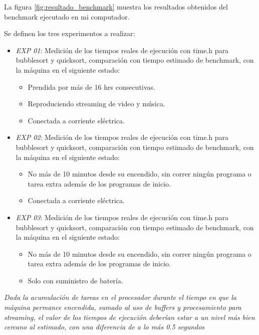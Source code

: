 \documentclass{memoria}
\begin{document}
La figura \ref{fig:resultado_benchmark} muestra los resultados obtenidos del benchmark ejecutado en mi computador.


Se definen los tres experimentos a realizar:
\begin{itemize}
\item \emph{EXP 01}: Medición de los tiempos reales de ejecución con time.h para bubblesort y quicksort, comparación con tiempo estimado de benchmark, con la máquina en el siguiente estado:
\begin{itemize}
\item Prendida por más de 16 hrs consecutivas.
\item Reproduciendo streaming de video y música.
\item Conectada a corriente eléctrica.
\end{itemize}
\item \emph{EXP 02}: Medición de los tiempos reales de ejecución con time.h para bubblesort y quicksort, comparación con tiempo estimado de benchmark, con la máquina en el siguiente estado:
\begin{itemize}
\item No más de 10 minutos desde su encendido, sin correr ningún programa o tarea extra además de los programas de inicio.
\item Conectada a corriente eléctrica.
\end{itemize}
\item \emph{EXP 03}: Medición de los tiempos reales de ejecución con time.h para bubblesort y quicksort, comparación con tiempo estimado de benchmark, con la máquina en el siguiente estado:
\begin{itemize}
\item No más de 10 minutos desde su encendido, sin correr ningún programa o tarea extra además de los programas de inicio.
\item Solo con suministro de batería.
\end{itemize}
\end{itemize}
 \emph{Dada la acumulación de tareas en el procesador durante el tiempo en que la máquina permance encendida, sumado al uso de buffers y procesamiento para streaming, el valor de los tiempos de ejecución deberían estar a un nivel más bien cercano al estimado, con una diferencia de a lo más 0.5 segundos }
\end{document}
